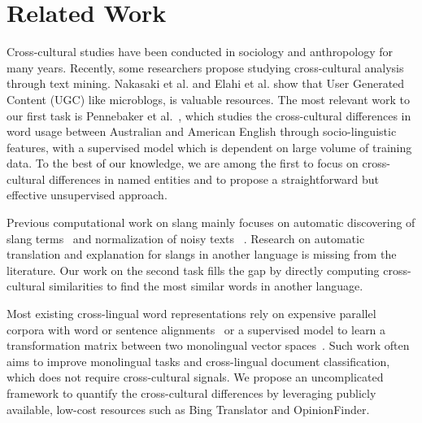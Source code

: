 \section{Related Work}
\label{sec:related}
Cross-cultural studies have been conducted in 
sociology and anthropology for many years. 
Recently, some researchers propose 
studying cross-cultural analysis through text mining.
Nakasaki et al.  and 
Elahi et al.  show that 
User Generated Content (UGC) like microblogs, 
is valuable resources. 
The most relevant work to our first task is Pennebaker 
et al.~, which studies the cross-cultural 
differences in word usage between Australian and American English through 
socio-linguistic features, with a supervised model which is dependent on large volume of training data. 
To the best of our knowledge, we are among the first to focus on cross-cultural differences in named entities and to propose a straightforward but effective unsupervised approach.

Previous computational work on slang mainly focuses on automatic 
discovering of slang terms~\cite{elsahar2014a} and normalization of noisy texts ~\cite{han2012automatically}. Research on automatic 
translation and explanation for slangs in another language is missing from the literature. 
Our work on the second task fills the gap by directly computing cross-cultural 
similarities to find the most similar words in another language.

Most existing cross-lingual word representations  
rely on expensive parallel corpora with word or sentence 
alignments~\cite{klementiev2012inducing,kovcisky2014learning} or  a 
supervised model to learn a transformation matrix between two monolingual 
vector spaces~\cite{Mikolov:2013tp}. 
Such work often aims to improve monolingual tasks and cross-lingual 
document classification, which does not require cross-cultural signals. 
We propose an uncomplicated framework to quantify the cross-cultural 
differences by leveraging publicly available, low-cost resources such 
as Bing Translator and OpinionFinder.
